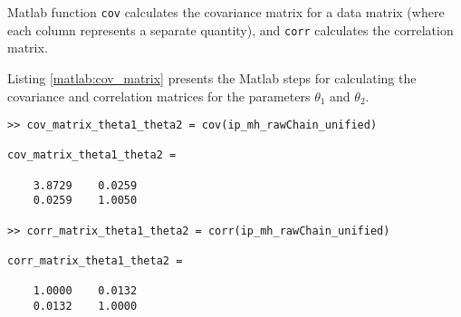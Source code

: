 Matlab function \verb+cov+ calculates the covariance matrix for a data matrix (where each column represents a separate quantity), 
and \verb+corr+ calculates the correlation matrix.

Listing \ref{matlab:cov_matrix} presents the Matlab steps for calculating the covariance and correlation matrices for the parameters $\theta_1$ and $\theta_2$.
\begin{lstlisting}[label=matlab:ip_cov_matrix,caption={Matlab code for finding covariance and correlation matrices.}]
% inside Matlab
>> cov_matrix_theta1_theta2 = cov(ip_mh_rawChain_unified)

cov_matrix_theta1_theta2 =

    3.8729    0.0259
    0.0259    1.0050
    
>> corr_matrix_theta1_theta2 = corr(ip_mh_rawChain_unified)

corr_matrix_theta1_theta2 =

    1.0000    0.0132
    0.0132    1.0000    
\end{lstlisting}
